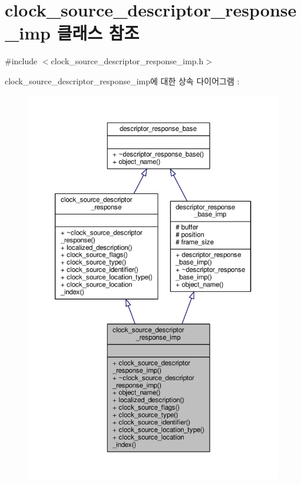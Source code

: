 \hypertarget{classavdecc__lib_1_1clock__source__descriptor__response__imp}{}\section{clock\+\_\+source\+\_\+descriptor\+\_\+response\+\_\+imp 클래스 참조}
\label{classavdecc__lib_1_1clock__source__descriptor__response__imp}


{\ttfamily \#include $<$clock\+\_\+source\+\_\+descriptor\+\_\+response\+\_\+imp.\+h$>$}



clock\+\_\+source\+\_\+descriptor\+\_\+response\+\_\+imp에 대한 상속 다이어그램 \+: 
\nopagebreak
\begin{figure}[H]
\begin{center}
\leavevmode
\includegraphics[width=350pt]{classavdecc__lib_1_1clock__source__descriptor__response__imp__inherit__graph}
\end{center}
\end{figure}


